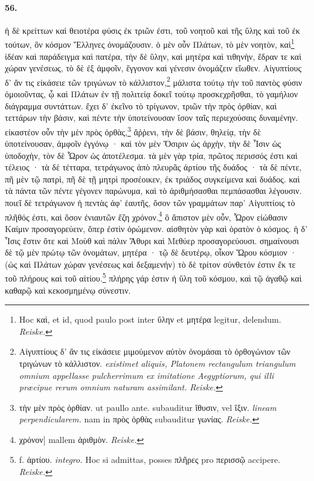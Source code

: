 \documentclass[a4paper, 11pt, oneside, polutonikogreek, german]{article}
\begin{document}
\paragraph{56.}
ἡ δὲ κρείττων καὶ θειοτέρα φύσις ἐκ τριῶν ἐστι, τοῦ νοητοῦ καὶ τῆς ὕλης καὶ τοῦ ἐκ τούτων, ὃν κόσμον Ἕλληνες ὀνομάζουσιν. ὁ μὲν οὖν Πλάτων, τὸ μὲν νοητὸν, καὶ\footnote{Hoc καὶ, et id, quod paulo post inter ὕλην et μητέρα legitur, delendum. \emph{Reiske.}} ἰδέαν καὶ παράδειγμα καὶ πατέρα, τὴν δὲ ὕλην, καὶ μητέρα καὶ τιθηνὴν, ἕδραν τε καὶ χώραν γενέσεως, τὸ δὲ ἐξ ἀμφοῖν, ἔγγονον καὶ γένεσιν ὀνομάζειν εἴωθεν. Αἰγυπτίους δ' ἄν τις εἰκάσειε τῶν τριγώνων τὸ κάλλιστον,\footnote{Αἰγυπτίους δ' ἂν τις εἰκάσειε μιμούμενον αὐτὸν ὀνομάσαι τὸ ὀρθογώνιον τῶν τριγώνων τὸ κάλλιστον. \emph{existimet aliquis, Platonem rectangulum triangulum omnium appellasse pulcherrimum ex imitatione Aegyptiorum, qui illi præcipue rerum omnium naturam assimilant.} \emph{Reiske.}} μάλιστα τούτῳ τὴν τοῦ παντὸς φύσιν ὁμοιοῦντας, ᾧ καὶ Πλάτων ἐν τῇ πολιτείᾳ δοκεῖ τούτῳ προσκεχρῆσθαι, τὸ γαμήλιον διάγραμμα συντάττων. ἔχει δ' ἐκεῖνο τὸ τρίγωνον, τριῶν τὴν πρὸς ὀρθίαν, καὶ τεττάρων τὴν βάσιν, καὶ πέντε τὴν ὑποτείνουσαν ἴσον ταῖς περιεχούσαις δυναμένην. εἰκαστέον οὖν τὴν μὲν πρὸς ὀρθὰς,\footnote{τὴν μὲν πρὸς ὀρθίαν. ut paullo ante. subauditur ἴθυσιν, vel ἴξιν. \emph{lineam perpendicularem.} nam in πρὸς ὀρθὰς subauditur γωνίας. \emph{Reiske.} } ἄῤῥενι, τὴν δὲ βάσιν, θηλείᾳ, τὴν δὲ ὑποτείνουσαν, ἀμφοῖν ἐγγόνῳ · καὶ τὸν μὲν Ὄσιριν ὡς ἀρχὴν, τὴν δὲ Ἶσιν ὡς ὑποδοχὴν, τὸν δὲ Ὧρον ὡς ἀποτέλεσμα. τὰ μὲν γὰρ τρία, πρῶτος περισσός ἐστι καὶ τέλειος · τὰ δὲ τέτταρα, τετράγωνος ἀπὸ πλευρᾶς ἀρτίου τῆς δυάδος · τὰ δὲ πέντε, πῆ μὲν τῷ πατρὶ, πῆ δὲ τῇ μητρὶ προσέοικεν, ἐκ τριάδος συγκείμενα καὶ δυάδος. καὶ τὰ πάντα τῶν πέντε γέγονεν παρώνυμα, καὶ τὸ ἀριθμήσασθαι πεμπάσασθαι λέγουσιν. ποιεῖ δὲ τετράγωνον ἡ πεντὰς ἀφ' ἑαυτῆς, ὅσον τῶν γραμμάτων παρ' Αἰγυπτίοις τὸ πλῆθός ἐστι, καὶ ὅσον ἐνιαυτῶν ἔζη χρόνον.\footnote{χρόνον] mallem ἀριθμὸν. \emph{Reiske.}} ὃ ἄπιστον μὲν οὖν, Ὧρον εἰώθασιν Καίμιν προσαγορεύειν, ὅπερ ἐστὶν ὁρώμενον. αἰσθητὸν γὰρ καὶ ὁρατὸν ὁ κόσμος. ἡ δ' Ἶσις ἔστιν ὅτε καὶ Μοὺθ καὶ πάλιν Ἄθυρι καὶ Μεθύερ προσαγορεύουσι. σημαίνουσι δὲ τῷ μὲν πρώτῳ τῶν ὀνομάτων, μητέρα · τῷ δὲ δευτέρῳ, οἶκον Ὥρου κόσμιον · (ὡς καὶ Πλάτων χώραν γενέσεως καὶ δεξαμενήν) τὸ δὲ τρίτον σύνθετόν ἐστιν ἔκ τε τοῦ πλήρους καὶ τοῦ αἰτίου.\footnote{f. ἀρτίου. \emph{integro.} Hoc si admittas, posses πλῆρες pro περισσῷ accipere. \emph{Reiske.}} πλήρης γάρ ἐστιν ἡ ὕλη τοῦ κόσμου, καὶ τῷ ἀγαθῷ καὶ καθαρῷ καὶ κεκοσμημένῳ σύνεστιν.
\end{document}
